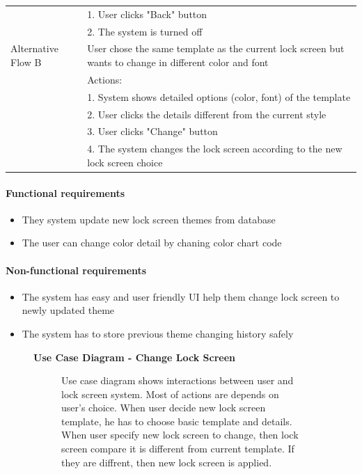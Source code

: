 \documentclass{article}
\begin{document}
\begin{table}[htbp]
\begin{tabularx}{\textwidth}{|>{\raggedright\arraybackslash}p{}|X|}
								 & 1. User clicks "Back" button \\
								 & 2. The system is turned off \\ \hline
				Alternative Flow B & User chose the same template as the current lock screen but wants to change in different color and font \\
								 & Actions: \\
								 & 1. System shows detailed options (color, font) of the template \\
								 & 2. User clicks the details different from the current style \\
								 & 3. User clicks "Change" button \\
								 & 4. The system changes the lock screen according to the new lock screen choice \\ \hline
			\end{tabularx}
		\end{table}
		\paragraph{Functional requirements}
		\begin{itemize}
			\item They system update new lock screen themes from database
			\item The user can change color detail by chaning color chart code
		\end{itemize}
		
		\paragraph{Non-functional requirements}
		\begin{itemize}
			\item The system has easy and user friendly UI help them change lock screen to newly updated theme
			\item The system has to store previous theme changing history safely
		\end{itemize}
		\newpage
		
		\begin{figure}[htbp]
			\textbf{Use Case Diagram - Change Lock Screen}
			\centering
			\begin{subfigure}{\textwidth}
				\resizebox{\textwidth}{!}{}
			\end{subfigure}
			\begin{subfigure}{\textwidth}
				Use case diagram shows interactions between user and lock screen system. Most of actions are depends on user's choice. When user decide new lock screen template, he has to choose basic template and details. When user specify new lock screen to change, then lock screen compare it is different from current template. If they are diffrent, then new lock screen is applied.
			\end{subfigure}
		\end{figure}
		\clearpage
\end{document}
